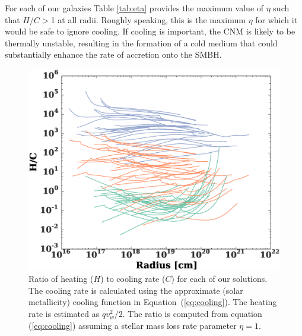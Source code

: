 \documentclass[usenatbib,fleqn]{mn2e}
\newcommand\lsim{\mathrel{\rlap{\lower4pt\hbox{\hskip1pt$\sim$}}
    \raise1pt\hbox{$<$}}}
\newcommand\gsim{\mathrel{\rlap{\lower4pt\hbox{\hskip1pt$\sim$}}
    \raise1pt\hbox{$>$}}}
\newcommand{\vw}{v_w}
\begin{document}
For each of our galaxies Table \ref{tab:eta} provides the maximum value of $\eta$ such that $H/C >$1 at all radii.  Roughly speaking, this is the maximum $\eta$ for which it would be safe to ignore cooling.  If cooling is important, the CNM is likely to be thermally unstable, resulting in the formation of a cold medium that could substantially enhance the rate of accretion onto the SMBH.  


\begin{figure}
  \includegraphics[width=\columnwidth]{cooling.eps}
  \caption{\label{fig:cooling} Ratio of heating ($H$) to cooling rate
    ($C$) for each of our solutions. The cooling rate is calculated
    using the approximate (solar metallicity) cooling function in
    Equation~(\ref{eq:cooling}). The heating rate is estimated as $q
    \vw^2/2$. The ratio is computed from equation (\ref{eq:cooling})
    assuming a stellar mass loss rate parameter $\eta=1$.}
\end{figure}
\end{document}
